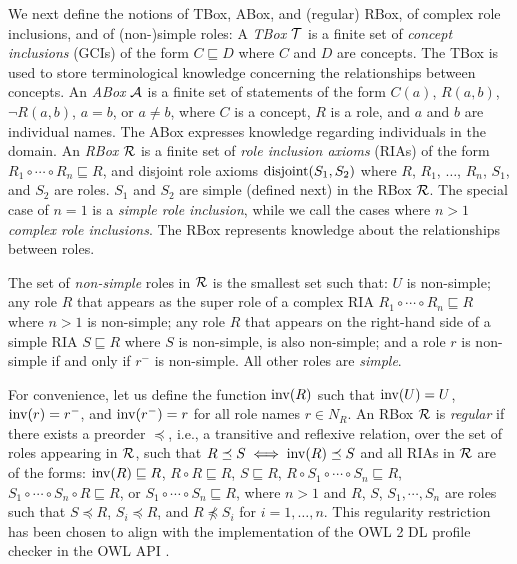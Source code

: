 We next define the notions of TBox, ABox, and (regular) RBox, of complex role inclusions, and of (non-)simple roles:
A \emph{TBox} $\mathcal{T}$ is a finite set of \emph{concept inclusions} (GCIs) of the form $C \sqsubseteq D$ where $C$ and $D$ are concepts. The TBox is used to store terminological knowledge concerning the relationships between concepts. 
%
An \emph{ABox} $\mathcal{A}$ is a finite set of statements of the form $C(a)$, $R(a,b)$, $\lnot R (a,b)$, $a = b$, or $a \not= b$, where $C$ is a concept, $R$ is a role, and $a$ and $b$ are individual names. The ABox expresses knowledge regarding individuals in the domain. 
%
An \emph{RBox} $\mathcal{R}$ is a finite set of \emph{role inclusion axioms} (RIAs) of the form $R_1 \circ \cdots \circ R_n \sqsubseteq R$, and disjoint role axioms $\operatorname{disjoint}(S_1, S_2)$ where $R$, $R_1$, $\dots$, $R_n$, $S_1$, and $S_2$ are roles. $S_1$ and $S_2$ are simple (defined next) in the RBox $\mathcal{R}$. The special case of $n = 1$ is a \emph{simple role inclusion}, while we call the cases where $n > 1$ \emph{complex role inclusions}. The RBox represents knowledge about the relationships between roles.

The set of \emph{non-simple} roles in $\mathcal{R}$ is the smallest set such that: $U$ is non-simple; any role $R$ that appears as the super role of a complex RIA $R_1 \circ \cdots \circ R_n \sqsubseteq R$ where $n > 1$ is non-simple; any role $R$ that appears on the right-hand side of a simple RIA $S \sqsubseteq R$ where $S$ is non-simple, is also non-simple; and a role $r$ is non-simple if and only if $r^-$ is non-simple.
All other roles are \emph{simple}.

For convenience, let us define the function $\operatorname{inv}(R)$ such that $\operatorname{inv}(U) = U$, $\operatorname{inv}(r) = r^-$, and $\operatorname{inv}(r^-) = r$ for all role names $r \in N_R$. 
%
An RBox $\mathcal{R}$ is \emph{regular} if there exists a preorder $\preceq$, i.e., a transitive and reflexive relation, over the set of roles appearing in $\mathcal{R}$, such that $R \preceq S \iff \operatorname{inv}(R) \preceq S$ and all RIAs in $\mathcal{R}$ are of the forms:
$\operatorname{inv}(R) \sqsubseteq R$,
$R \circ R \sqsubseteq R$,
$S \sqsubseteq R$, $R \circ S_1 \circ \cdots \circ S_n \sqsubseteq R$,
$S_1 \circ \cdots \circ S_n \circ R \sqsubseteq R$, or
$S_1 \circ \cdots \circ S_n \sqsubseteq R$,
where $n > 1$ and $R$, $S$, $S_1, \cdots, S_n$ are roles such that $S \preceq R$, $S_i \preceq R$, and $R \not\preceq S_i$ for $i = 1, \dots, n$. This regularity restriction has been chosen to align with the implementation of the OWL 2 DL \cite{motik2012ontology} profile checker in the OWL API \cite{horridge2011owl}.

